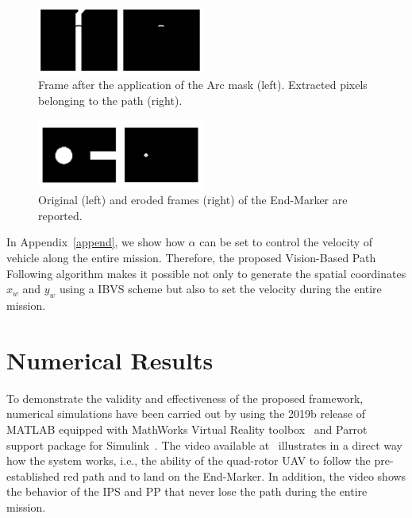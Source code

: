 \documentclass[a4paper,twocolumn,10pt]{article}
\begin{document}
    \begin{figure}
        \centering
        \includegraphics[width=0.49\textwidth]{pics/fig8_frame.png}
        \caption{Frame after the application of the Arc mask (left). Extracted pixels belonging to the 
        path (right).}
        \label{fig:fig8frames}
    \end{figure}
    \begin{figure}
        \centering
        \includegraphics[width=0.49\textwidth]{pics/fig9_frame.png}
        \caption{Original (left) and eroded frames (right) of the End-Marker are reported.}
        \label{fig:fig9frame}
    \end{figure}

    In Appendix~\ref{append}, we show how $\alpha$ can be set to control the velocity of vehicle along the entire mission. Therefore, the proposed Vision-Based Path Following algorithm makes it possible not only to generate the spatial coordinates $x_w$ and $y_w$ using a IBVS scheme but also to set the velocity during the entire mission.

    \section{Numerical Results}
    \label{sec:NumRes}

    To demonstrate the validity and effectiveness of the proposed framework, numerical simulations have been carried out by using the 2019b release of MATLAB equipped with MathWorks Virtual Reality 
    toolbox~\cite{16_Mathworks_url} and Parrot support package for Simulink~\cite{15_Mathworks_url}. 
    The video available at~\cite{YouTubeVideo} illustrates in a direct way how the system works, i.e., the ability of the quad-rotor UAV to follow the pre-established red path and to land on the End-Marker. In addition, the video shows the behavior of the IPS and PP that never lose the path during the entire mission. 
\end{document}
